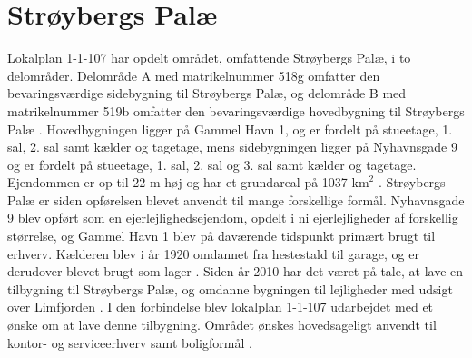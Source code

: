 \section{Strøybergs Palæ}
Lokalplan 1-1-107 har opdelt området, omfattende Strøybergs Palæ, i to delområder. Delområde A med matrikelnummer 518g omfatter den bevaringsværdige sidebygning til Strøybergs Palæ, og delområde B med matrikelnummer 519b omfatter den bevaringsværdige hovedbygning til Strøybergs Palæ \citep[ s. 7]{lokalplan}. Hovedbygningen ligger på Gammel Havn 1, og er fordelt på stueetage, 1. sal, 2. sal samt kælder og tagetage, mens sidebygningen ligger på Nyhavnsgade 9 og er fordelt på stueetage, 1. sal, 2. sal og 3. sal samt kælder og tagetage. Ejendommen er op til 22 m høj og har et grundareal på 1037 $\text{km}^2$ \citep{byggesagen}.
\newline \indent{     }  Strøybergs Palæ er siden opførelsen blevet anvendt til mange forskellige formål. Nyhavnsgade 9 blev opført som en ejerlejlighedsejendom, opdelt i ni ejerlejligheder af forskellig størrelse, og Gammel Havn 1 blev på daværende tidspunkt primært brugt til erhverv. Kælderen blev i år 1920 omdannet fra hestestald til garage, og er derudover blevet brugt som lager \citep{byggesagen}.
\newline \indent{     }  Siden år 2010 har det været på tale, at lave en tilbygning til Strøybergs Palæ, og omdanne bygningen til lejligheder med udsigt over Limfjorden \citep{Calum}. I den forbindelse blev lokalplan 1-1-107 udarbejdet med et ønske om at lave denne tilbygning. Området ønskes hovedsageligt anvendt til kontor- og serviceerhverv samt boligformål \citep[ s. 7]{lokalplan}.